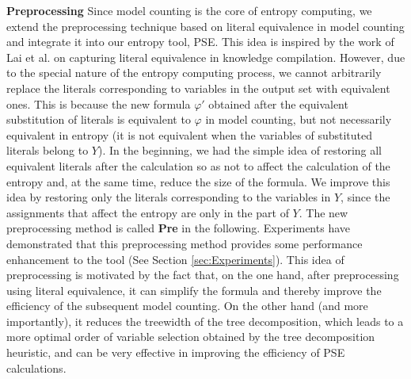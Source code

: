 \textbf{Preprocessing} 
Since model counting is the core of entropy computing, we extend the preprocessing technique based on literal equivalence in model counting and integrate it into our entropy tool, PSE.
This idea is inspired by the work of Lai et al. \cite{lai2021power} on capturing literal equivalence in knowledge compilation.
However, due to the special nature of the entropy computing process, we cannot arbitrarily replace the literals corresponding to variables in the output set with equivalent ones.
This is because the new formula $\varphi'$ obtained after the equivalent substitution of literals is equivalent to $\varphi$ in model counting, but not necessarily equivalent in entropy (it is not equivalent when the variables of substituted literals belong to $Y$).
In the beginning, we had the simple idea of restoring all equivalent literals after the calculation so as not to affect the calculation of the entropy and, at the same time, reduce the size of the formula.
We improve this idea by restoring only the literals corresponding to the variables in $Y$, since the assignments that affect the entropy are only in the part of $Y$. 
The new preprocessing method is called \textbf{Pre} in the following.
Experiments have demonstrated that this preprocessing method provides some performance enhancement to the tool (See Section \ref{sec:Experiments}).
This idea of preprocessing is motivated by the fact that, on the one hand, after preprocessing using literal equivalence, it can simplify the formula and thereby improve the efficiency of the subsequent model counting.
On the other hand (and more importantly), it reduces the treewidth of the tree decomposition, which leads to a more optimal order of variable selection obtained by the tree decomposition heuristic, and can be very effective in improving the efficiency of PSE calculations.





